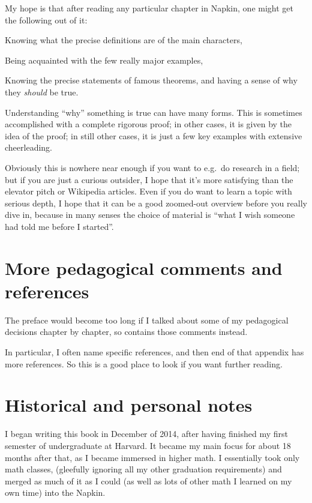 My hope is that after reading any particular chapter in Napkin,
one might get the following out of it:
\begin{itemize}
	\ii Knowing what the precise definitions are of the main characters,

	\ii Being acquainted with the few really major examples,

	\ii Knowing the precise statements of famous theorems,
	and having a sense of why they \emph{should} be true.
\end{itemize}
Understanding ``why'' something is true can have many forms.
This is sometimes accomplished with a complete rigorous proof;
in other cases, it is given by the idea of the proof;
in still other cases, it is just a few key examples
with extensive cheerleading.

Obviously this is nowhere near enough if you want to e.g.\ do research in a field;
but if you are just a curious outsider,
I hope that it's more satisfying than the elevator pitch or Wikipedia articles.
Even if you do want to learn a topic with serious depth,
I hope that it can be a good zoomed-out overview before you really dive in,
because in many senses the choice of material is
``what I wish someone had told me before I started''.


\section*{More pedagogical comments and references}
The preface would become too long if I talked about
some of my pedagogical decisions chapter by chapter,
so  contains those comments instead.

In particular, I often name specific references,
and then end of that appendix has more references.
So this is a good place to look if you want further reading.

\section*{Historical and personal notes}
I began writing this book in December of 2014,
after having finished my first semester of undergraduate at Harvard.
It became my main focus for about 18 months after that,
as I became immersed in higher math.
I essentially took only math classes,
(gleefully ignoring all my other graduation requirements)
and merged as much of it as I could
(as well as lots of other math I learned on my own time)
into the Napkin.

